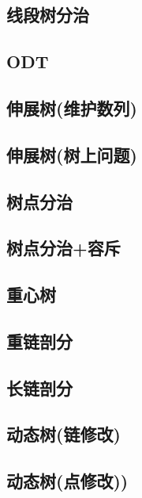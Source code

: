 \documentclass{article}
\begin{document}
\subsection{线段树分治} 


\subsection{ODT} 


\subsection{伸展树(维护数列)} 

\subsection{伸展树(树上问题)} 


\subsection{树点分治} 

\subsection{树点分治+容斥} 

\subsection{重心树} 

\subsection{重链剖分} 

\subsection{长链剖分} 

\subsection{动态树(链修改)} 

\subsection{动态树(点修改))} 

\end{document}
